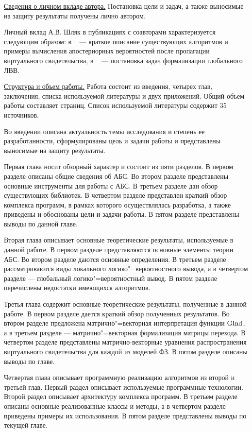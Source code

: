 \underline{Сведения о личном вкладе автора.}
Постановка цели и задач, а также выносимые на защиту результаты получены лично автором. 

Личный вклад А.В. Шляк в публикациях с соавторами характеризуется следующим образом: в ~\cite{9} --- краткое описание существующих алгоритмов и примеры вычисления апостериорных вероятностей после пропагации виртуального свидетельства, в ~\cite{70} --- постановка задач формализации глобального ЛВВ.

\underline{Структура и объем работы.} Работа состоит из введения, четырех
глав, заключения, списка используемой литературы и двух приложений. Общий объем работы составляет \pageref{LastPage} страниц. Список используемой литературы содержит 35 источников.

Во введении описана актуальность темы исследования и степень ее разработанности, сформулированы цель и задачи работы и представлены выносимые на защиту результаты.

Первая глава носит обзорный характер и состоит из пяти разделов. В первом разделе описаны общие сведения об АБС. Во втором разделе представлены основные инструменты для работы с АБС. В третьем разделе дан обзор существующих библиотек. В четвертом разделе представлен краткий обзор комплекса программ, в рамках которого осуществлялась разработка, а также приведены и обоснованы  цели и задачи работы. В пятом разделе представлены выводы по данной главе.

Вторая глава описывает основные теоретические результаты, используемые в данной работе. В первом разделе представляются основные элементы теории АБС. Во втором разделе даются основные определения. В третьем разделе рассматриваются виды локального логико"=вероятностного вывода, а в четвертом разделе --- глобальный логико"=вероятностный вывод. В пятом разделе перечислены недостатки имеющихся алгоритмов.

Третья глава содержит основные теоретические результаты, полученные в данной работе. В первом разделе дается краткий обзор полученных результатов. Во втором разделе предложена матрично"=векторная интерпретация функции $\mathrm{GInd}$, а в третьем разделе --- матрично"=векторная формализация матрицы перехода. В четвертом разделе представлены матрично-векторные уравнения распространения виртуального свидетельства для каждой из моделей ФЗ. В пятом разделе описаны выводы по главе.

Четвертая глава описывает программную реализацию алгоритмов из второй и третьей глав. Первый раздел описывает используемые программные технологии. Второй раздел описывает архитектуру комплекса программ. В третьем разделе описаны основные реализованные классы и методы, а в четвертом разделе приведены примеры их использования. В пятом разделе представлены выводы по текущей главе. 

